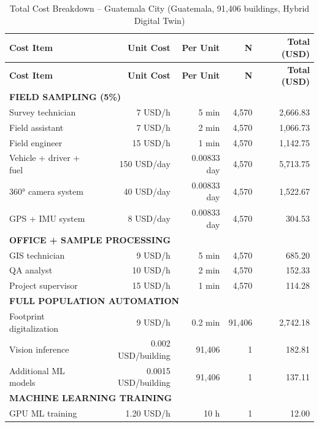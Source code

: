 \begin{longtable}{lrrrr}
\caption{Total Cost Breakdown – Guatemala City (Guatemala, 91,406 buildings, Hybrid Digital Twin)} \\
\hline
\textbf{Cost Item} & \textbf{Unit Cost} & \textbf{Per Unit} & \textbf{N} & \textbf{Total (USD)} \\
\hline
\endfirsthead

\hline
\textbf{Cost Item} & \textbf{Unit Cost} & \textbf{Per Unit} & \textbf{N} & \textbf{Total (USD)} \\
\hline
\endhead

\multicolumn{5}{l}{\textbf{FIELD SAMPLING (5\%)}} \\

Survey technician & 7 USD/h & 5 min & 4,570 & 2,666.83 \\
Field assistant & 7 USD/h & 2 min & 4,570 & 1,066.73 \\
Field engineer & 15 USD/h & 1 min & 4,570 & 1,142.75 \\
Vehicle + driver + fuel & 150 USD/day & 0.00833 day & 4,570 & 5,713.75 \\
360° camera system & 40 USD/day & 0.00833 day & 4,570 & 1,522.67 \\
GPS + IMU system & 8 USD/day & 0.00833 day & 4,570 & 304.53 \\
\hline

\multicolumn{5}{l}{\textbf{OFFICE + SAMPLE PROCESSING}} \\

GIS technician & 9 USD/h & 5 min & 4,570 & 685.20 \\
QA analyst & 10 USD/h & 2 min & 4,570 & 152.33 \\
Project supervisor & 15 USD/h & 1 min & 4,570 & 114.28 \\
\hline

\multicolumn{5}{l}{\textbf{FULL POPULATION AUTOMATION}} \\

Footprint digitalization & 9 USD/h & 0.2 min & 91,406 & 2,742.18 \\
Vision inference & 0.002 USD/building & 91,406 & 1 & 182.81 \\
Additional ML models & 0.0015 USD/building & 91,406 & 1 & 137.11 \\
\hline

\multicolumn{5}{l}{\textbf{MACHINE LEARNING TRAINING}} \\

GPU ML training & 1.20 USD/h & 10 h & 1 & 12.00 \\
\hline


\end{longtable}
